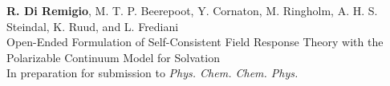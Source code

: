 \begin{description}[leftmargin=2mm, style=nextline]
\item[\paper{V}]
  \textbf{R. Di Remigio}, M. T. P. Beerepoot, Y. Cornaton, M. Ringholm,
  A. H. S. Steindal, K. Ruud, and L. Frediani
  \\
  \textsf{
  Open-Ended Formulation of Self-Consistent Field Response Theory with
  the Polarizable Continuum Model for Solvation
  }
  \\
  In preparation for submission to \textit{Phys. Chem. Chem. Phys.}
\label{pcmopenrsp}
\end{description}
\renewcommand{\descriptionlabel}[1]{\hspace*{\labelsep}\spacedlowsmallcaps{#1}}
